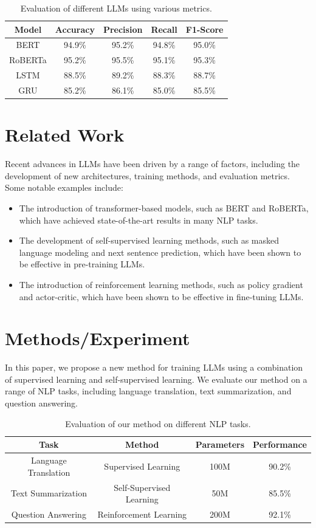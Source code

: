 \documentclass{article}
\begin{document}
\begin{table}[h]
\centering
\begin{tabular}{|c|c|c|c|c|}
\hline
Model & Accuracy & Precision & Recall & F1-Score \\
\hline
BERT & 94.9\% & 95.2\% & 94.8\% & 95.0\% \\
\hline
RoBERTa & 95.2\% & 95.5\% & 95.1\% & 95.3\% \\
\hline
LSTM & 88.5\% & 89.2\% & 88.3\% & 88.7\% \\
\hline
GRU & 85.2\% & 86.1\% & 85.0\% & 85.5\% \\
\hline
\end{tabular}
\caption{Evaluation of different LLMs using various metrics.}
\label{table:evaluation_metrics}
\end{table}

\section{Related Work}

Recent advances in LLMs have been driven by a range of factors, including the development of new architectures, training methods, and evaluation metrics. Some notable examples include:

\begin{itemize}
\item The introduction of transformer-based models, such as BERT and RoBERTa, which have achieved state-of-the-art results in many NLP tasks.
\item The development of self-supervised learning methods, such as masked language modeling and next sentence prediction, which have been shown to be effective in pre-training LLMs.
\item The introduction of reinforcement learning methods, such as policy gradient and actor-critic, which have been shown to be effective in fine-tuning LLMs.
\end{itemize}

\section{Methods/Experiment}

In this paper, we propose a new method for training LLMs using a combination of supervised learning and self-supervised learning. We evaluate our method on a range of NLP tasks, including language translation, text summarization, and question answering.

\begin{table}[h]
\centering
\begin{tabular}{|c|c|c|c|}
\hline
Task & Method & Parameters & Performance \\
\hline
Language Translation & Supervised Learning & 100M & 90.2\% \\
\hline
Text Summarization & Self-Supervised Learning & 50M & 85.5\% \\
\hline
Question Answering & Reinforcement Learning & 200M & 92.1\% \\
\hline
\end{tabular}
\caption{Evaluation of our method on different NLP tasks.}
\label{table:methods_experiment}
\end{table}
\end{document}
